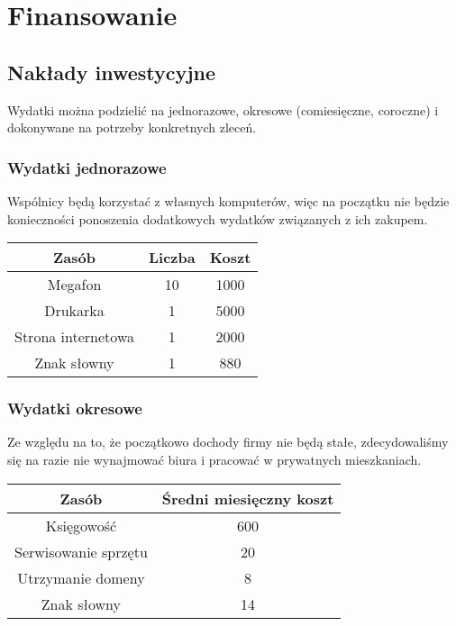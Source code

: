 \documentclass{article}
\begin{document}
\section{Finansowanie}
\subsection{Nakłady inwestycyjne}
Wydatki można podzielić na jednorazowe, okresowe (comiesięczne, coroczne) i dokonywane na potrzeby konkretnych zleceń.

\subsubsection{Wydatki jednorazowe}
Wspólnicy będą korzystać z własnych komputerów, więc na początku nie będzie konieczności ponoszenia dodatkowych wydatków związanych z ich zakupem.
\begin{table}[H]
\label{table2}
\vspace{0.3cm}
\hspace{-2cm}
\centering
\begin{tabular}{|c|c|c|}
\hline
Zasób & Liczba & Koszt \\
\hline
Megafon & 10 & 1000 \\
Drukarka & 1 & 5000 \\
Strona internetowa & 1 & 2000 \\
Znak słowny & 1 & 880 \\
\hline
\end{tabular}
\end{table}

\subsubsection{Wydatki okresowe}
Ze względu na to, że początkowo dochody firmy nie będą stałe, zdecydowaliśmy się na razie nie wynajmować biura i pracować w prywatnych mieszkaniach.

\begin{table}[H]
\label{table2}
\vspace{0.3cm}
\hspace{-2cm}
\centering
\begin{tabular}{|c|c|}
\hline
Zasób & Średni miesięczny koszt \\
\hline
Księgowość & 600 \\
Serwisowanie sprzętu & 20 \\
Utrzymanie domeny & 8 \\
Znak słowny & 14 \\
\hline
\end{tabular}
\end{table}
\end{document}
